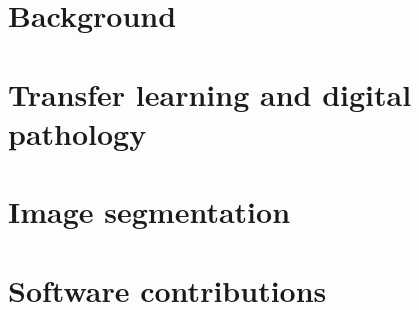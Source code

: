 % 
\pagestyle{empty}



\frontmatter






\mainmatter
\pagestyle{scrheadings}



\part{Background}
\label{part:background}



\part{Transfer learning and digital pathology}
\label{part:transfer}



\part{Image segmentation}
\label{part:segmentation}


\part{Software contributions}
\label{part:software}


\appendix


\backmatter
\listoffigures
\listoftables

\printbibliography





